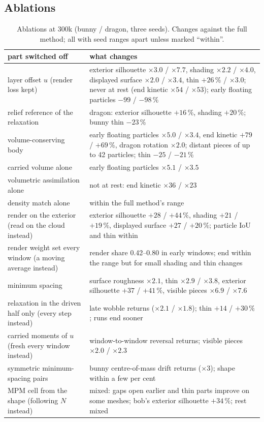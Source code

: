 \subsection{Ablations}
\begin{table}[t]
\centering
\footnotesize
\setlength{\tabcolsep}{4pt}
\caption{Ablations at 300k (bunny / dragon, three seeds). \textmd{Changes against the full method; all with seed ranges
apart unless marked ``within''.}}
\label{ch4:tab_ablation}
\begin{tabular}{>{\raggedright\arraybackslash}p{3.6cm}>{\raggedright\arraybackslash}p{9.8cm}}
\toprule
part switched off & what changes \\
\midrule
layer offset $u$ (render loss kept) & exterior silhouette $\times3.0$ / $\times7.7$, shading $\times2.2$ / $\times4.0$,
  displayed surface $\times2.0$ / $\times3.4$, thin $+26\,\%$ / $\times3.0$; never at rest (end kinetic $\times54$ /
  $\times53$); early floating particles $-99$ / $-98\,\%$ \\
relief reference of the relaxation & dragon: exterior silhouette $+16\,\%$, shading $+20\,\%$; bunny thin $-23\,\%$ \\
volume-conserving body & early floating particles $\times5.0$ / $\times3.4$, end kinetic $+79$ / $+69\,\%$, dragon
  rotation $\times2.0$; distant pieces of up to 42 particles; thin $-25$ / $-21\,\%$ \\
\quad carried volume alone & early floating particles $\times5.1$ / $\times3.5$ \\
\quad volumetric assimilation alone & not at rest: end kinetic $\times36$ / $\times23$ \\
\quad density match alone & within the full method's range \\
render on the exterior (read on the cloud instead) & exterior silhouette $+28$ / $+44\,\%$, shading $+21$ / $+19\,\%$,
  displayed surface $+27$ / $+20\,\%$; particle IoU and thin within \\
render weight set every window (a moving average instead) & render share 0.42--0.80 in early windows; end within the
  range but for small shading and thin changes \\
minimum spacing & surface roughness $\times2.1$, thin $\times2.9$ / $\times3.8$, exterior silhouette $+37$ / $+41\,\%$,
  visible pieces $\times6.9$ / $\times7.6$ \\
relaxation in the driven half only (every step instead) & late wobble returns ($\times2.1$ / $\times1.8$); thin $+14$ /
  $+30\,\%$; runs end sooner \\
carried moments of $u$ (fresh every window instead) & window-to-window reversal returns; visible pieces $\times2.0$ /
  $\times2.3$ \\
symmetric minimum-spacing pairs & bunny centre-of-mass drift returns ($\times3$); shape within a few per cent \\
MPM cell from the shape (following $N$ instead) & mixed: gaps open earlier and thin parts improve on some meshes; bob's
  exterior silhouette $+34\,\%$; rest mixed \\
\bottomrule
\end{tabular}
\end{table}
